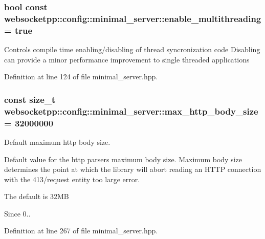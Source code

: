 \subsubsection[{\texorpdfstring{enable\+\_\+multithreading}{enable\_multithreading}}]{\setlength{\rightskip}{0pt plus 5cm}bool const websocketpp\+::config\+::minimal\+\_\+server\+::enable\+\_\+multithreading = true\hspace{0.3cm}{\ttfamily [static]}}\hypertarget{structwebsocketpp_1_1config_1_1minimal__server_a671a693af60cb11d9526d58aedce515c}{}\label{structwebsocketpp_1_1config_1_1minimal__server_a671a693af60cb11d9526d58aedce515c}
Controls compile time enabling/disabling of thread syncronization code Disabling can provide a minor performance improvement to single threaded applications 

Definition at line 124 of file minimal\+\_\+server.\+hpp.

\subsubsection[{\texorpdfstring{max\+\_\+http\+\_\+body\+\_\+size}{max\_http\_body\_size}}]{\setlength{\rightskip}{0pt plus 5cm}const size\+\_\+t websocketpp\+::config\+::minimal\+\_\+server\+::max\+\_\+http\+\_\+body\+\_\+size = 32000000\hspace{0.3cm}{\ttfamily [static]}}\hypertarget{structwebsocketpp_1_1config_1_1minimal__server_a56756239e0904949156e630c1f48d95e}{}\label{structwebsocketpp_1_1config_1_1minimal__server_a56756239e0904949156e630c1f48d95e}


Default maximum http body size. 

Default value for the http parser\textquotesingle{}s maximum body size. Maximum body size determines the point at which the library will abort reading an H\+T\+TP connection with the 413/request entity too large error.

The default is 32\+MB

\begin{DoxySince}{Since}
0.. 
\end{DoxySince}


Definition at line 267 of file minimal\+\_\+server.\+hpp.

